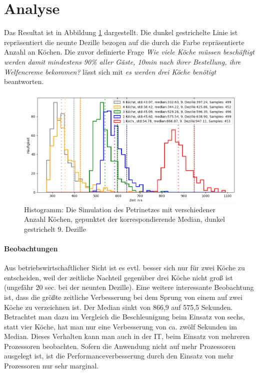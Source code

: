 \section*{Analyse} %
\label{sec:analyse}
Das Resultat ist in Abbildung \ref{pic:sim} dargestellt. Die dunkel gestrichelte Linie ist repräsentiert die neunte Dezille bezogen auf die durch die Farbe repräsentierte Anzahl an Köchen. Die zuvor definierte Frage \textit{Wie viele Köche müssen beschäftigt werden damit mindestens 90\% aller Gäste, 10min nach ihrer Bestellung, ihre Welfencreme bekommen?} lässt sich mit \textit{es werden drei Köche benötigt} beantworten.

\begin{figure}[ht]
  \includegraphics[width=1\textwidth]{pics/sim.png}
  \caption{Histogramm: Die Simulation des Petrinetzes mit verschiedener Anzahl Köchen, gepunktet der korrespondierende Median, dunkel gestrichelt 9. Dezille}
  \label{pic:sim}
\end{figure}


\paragraph{Beobachtungen}
Aus betriebswirtschaftlicher Sicht ist es evtl. besser sich nur für zwei Köche zu entscheiden, weil der zeitliche Nachteil gegenüber drei Köche nicht groß ist (ungefähr 20 sec. bei der neunten Dezille). Eine weitere interessante Beobachtung ist, dass die größte zeitliche Verbesserung bei dem Sprung von einem auf zwei Köche zu verzeichnen ist. Der Median sinkt von 866,9 auf 575,5 Sekunden. Betrachtet man dazu im Vergleich die Beschleunigung beim Einsatz von sechs, statt vier Köche, hat man nur eine Verbesserung von ca. zwölf Sekunden im Median.
Dieses Verhalten kann man auch in der IT, beim Einsatz von mehreren Prozessoren beobachten. Sofern die Anwendung nicht auf mehr Prozessoren ausgelegt ist, ist die Performanceverbesserung durch den Einsatz von mehr Prozessoren nur sehr marginal. \\

